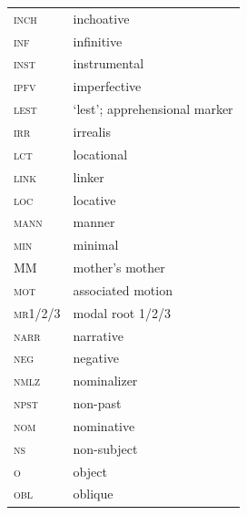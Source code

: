 \documentclass[output=paper,colorlinks,citecolor=brown]{langscibook}
\begin{document}
\begin{tabularx}{.5\textwidth}{@{}lQ@{}}
\textsc{inch} & inchoative \\
\textsc{inf} & infinitive \\
\textsc{inst} & instrumental \\
\textsc{ipfv} & imperfective \\
\textsc{lest} & `lest'; apprehensional marker \\
\textsc{irr} & irrealis \\
\textsc{lct} & locational \\
\textsc{link} &  linker\\
\textsc{loc} & locative \\
\textsc{mann} & manner \\
\textsc{min} & minimal \\
MM & mother's mother\\
\textsc{mot} & associated motion \\
\textsc{mr1/2/3} & modal root 1/2/3 \\
\textsc{narr} & narrative\\
\textsc{neg} & negative \\
\textsc{nmlz} & nominalizer \\
\textsc{npst} & non-past \\
\textsc{nom} & nominative \\
\textsc{ns} & non-subject \\
\textsc{o} & object \\
\textsc{obl} & oblique \\
\end{tabularx}
\end{document}
